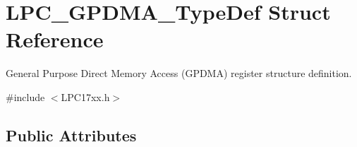 \hypertarget{struct_l_p_c___g_p_d_m_a___type_def}{\section{\-L\-P\-C\-\_\-\-G\-P\-D\-M\-A\-\_\-\-Type\-Def \-Struct \-Reference}
\label{struct_l_p_c___g_p_d_m_a___type_def}
}


\-General \-Purpose \-Direct \-Memory \-Access (\-G\-P\-D\-M\-A) register structure definition.  




{\ttfamily \#include $<$\-L\-P\-C17xx.\-h$>$}

\subsection*{\-Public \-Attributes}
